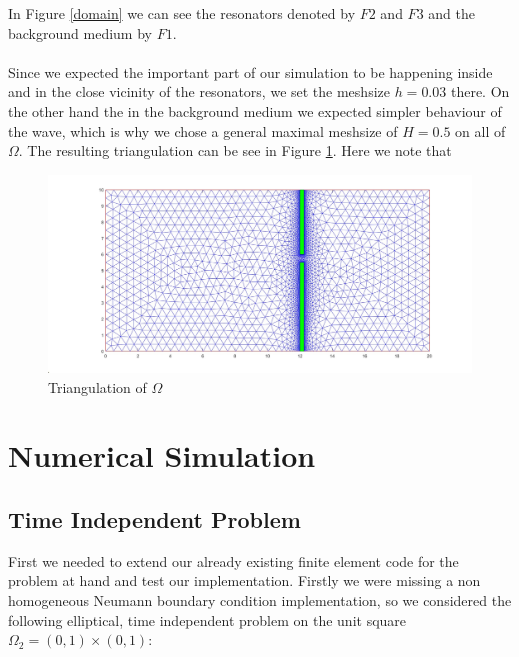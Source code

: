 \documentclass{article}
\begin{document}
In Figure \ref{domain} we can see the resonators denoted by $F2$ and $F3$ and the background medium by $F1$. \\ \\

Since we expected the important part of our simulation to be happening inside and in the close vicinity of the resonators, we set the meshsize $h = 0.03$ there. On the other hand the in the background medium we expected simpler behaviour of the wave, which is why we chose a general maximal meshsize of $H = 0.5$ on all of $\Omega$. The resulting triangulation can be see in Figure \ref{triangulation}. Here we note that 

\begin{figure}[h]
\centering
\includegraphics[width = \linewidth]{triangulation.jpg}
\caption{Triangulation of $\Omega$}
\label{triangulation}
\end{figure}

\section{Numerical Simulation}
\subsection{Time Independent Problem}
First we needed to extend our already existing finite element code for the problem at hand and test our implementation. Firstly we were missing a non homogeneous Neumann boundary condition implementation, so we considered the following elliptical, time independent problem on the unit square $\Omega_2 = (0,1) \times (0,1)$:
\end{document}

